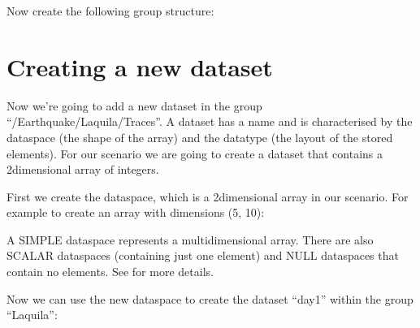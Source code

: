 \documentclass[letterpaper,10pt,english]{sphinxmanual}
\begin{document}
\sphinxAtStartPar
Now create the following group structure:

\noindent{}


\chapter{Creating a new dataset}
\label{\detokenize{index:creating-a-new-dataset}}
\sphinxAtStartPar
Now we’re going to add a new dataset in the group “/Earthquake/Laquila/Traces”. A dataset has a name and is characterised by the dataspace (the shape of the array) and the datatype (the layout of the stored elements). For our scenario we are going to create a dataset that contains a 2\sphinxhyphen{}dimensional array of integers.

\sphinxAtStartPar
First we create the dataspace, which is a 2\sphinxhyphen{}dimensional array in our scenario. For example to create an array with dimensions (5, 10):

\begin{sphinxVerbatim}[commandchars=\\\{\}]
 \PYG{p}{[}\PYG{p}{]}
\PYG{p}{[}\PYG{p}{]}  
\PYG{p}{[}\PYG{p}{]}  
    
\end{sphinxVerbatim}

\sphinxAtStartPar
A SIMPLE dataspace represents a multidimensional array. There are also SCALAR dataspaces (containing just one element) and NULL dataspaces that contain no elements. See  for more details.

\sphinxAtStartPar
Now we can use the new dataspace to create the dataset “day1” within the group “Laquila”:

\begin{sphinxVerbatim}[commandchars=\\\{\}]
        
\end{sphinxVerbatim}
\end{document}
